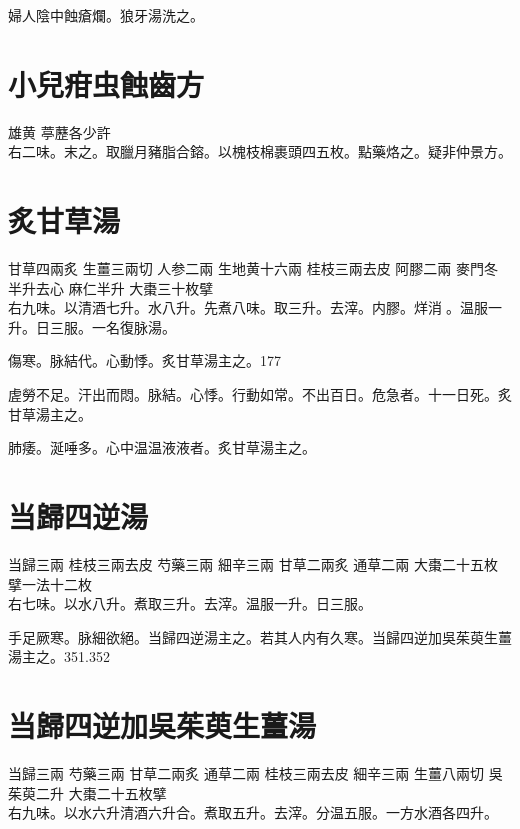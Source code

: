 婦人陰中蝕瘡爛。狼牙湯洗之。

\section{小兒疳虫蝕齒方}

雄黄{ }葶藶{\scriptsize 各少許}\\
右二味。末之。取臘月豬脂合鎔。以槐枝棉裹頭四五枚。點藥烙之。{\scriptsize 疑非仲景方。}

\section{炙甘草湯}

甘草{\scriptsize 四兩炙} 生薑{\scriptsize 三兩切} 人参{\scriptsize 二兩} 生地黄{\scriptsize 十六兩} 桂枝{\scriptsize 三兩去皮} 阿膠{\scriptsize 二兩} 麥門冬{\scriptsize 半升去心} 麻仁{\scriptsize 半升} 大棗{\scriptsize 三十枚擘}\\
右九味。以清酒七升。水八升。先煮八味。取三升。去滓。内膠。烊消{\sungii 𥁞}。温服一升。日三服。一名復脉湯。

傷寒。脉結代。心動悸。炙甘草湯主之。177

虗勞不足。汗出而悶。脉結。心悸。行動如常。不出百日。危急者。十一日死。炙甘草湯主之。

肺痿。涎唾多。心中温温液液者。炙甘草湯主之。

\section{当歸四逆湯}

当歸{\scriptsize 三兩} 桂枝{\scriptsize 三兩去皮} 芍藥{\scriptsize 三兩} 細辛{\scriptsize 三兩} 甘草{\scriptsize 二兩炙} 通草{\scriptsize 二兩} 大棗{\scriptsize 二十五枚擘一法十二枚}\\
右七味。以水八升。煮取三升。去滓。温服一升。日三服。

手足厥寒。脉細欲絕。当歸四逆湯主之。若其人内有久寒。当歸四逆加吳茱萸生薑湯主之。351.352

\section{当歸四逆加吳茱萸生薑湯}

当歸{\scriptsize 三兩} 芍藥{\scriptsize 三兩} 甘草{\scriptsize 二兩炙} 通草{\scriptsize 二兩} 桂枝{\scriptsize 三兩去皮} 細辛{\scriptsize 三兩} 生薑{\scriptsize 八兩切} 吳茱萸{\scriptsize 二升} 大棗{\scriptsize 二十五枚擘}\\
右九味。以水六升清酒六升合。煮取五升。去滓。分温五服。{\scriptsize 一方水酒各四升。}

